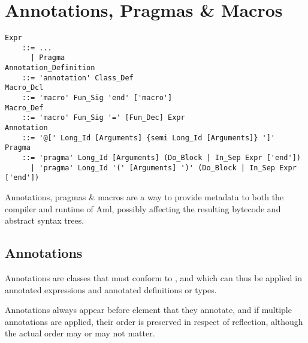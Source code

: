 
\chapter{Annotations, Pragmas \& Macros}
\label{sec:annotations}
\label{sec:pragmas}
\label{sec:macros}

\minitoc

\newpage


\grammar\begin{lstlisting}
Expr
    ::= ...
      | Pragma
Annotation_Definition 
    ::= 'annotation' Class_Def
Macro_Dcl
    ::= 'macro' Fun_Sig 'end' ['macro']
Macro_Def 
    ::= 'macro' Fun_Sig '=' [Fun_Dec] Expr
Annotation 
    ::= '@[' Long_Id [Arguments] {semi Long_Id [Arguments]} ']'
Pragma 
    ::= 'pragma' Long_Id [Arguments] (Do_Block | In_Sep Expr ['end'])
      | 'pragma' Long_Id '(' [Arguments] ')' (Do_Block | In_Sep Expr ['end'])
\end{lstlisting}

Annotations, pragmas \& macros are a way to provide metadata to both the compiler and runtime of Aml, possibly affecting the resulting bytecode and abstract syntax trees. 





\section{Annotations}

Annotations are classes that must conform to , and which can thus be applied in annotated expressions and annotated definitions or types. 

Annotations always appear before element that they annotate, and if multiple annotations are applied, their order is preserved in respect of reflection, although the actual order may or may not matter. 






